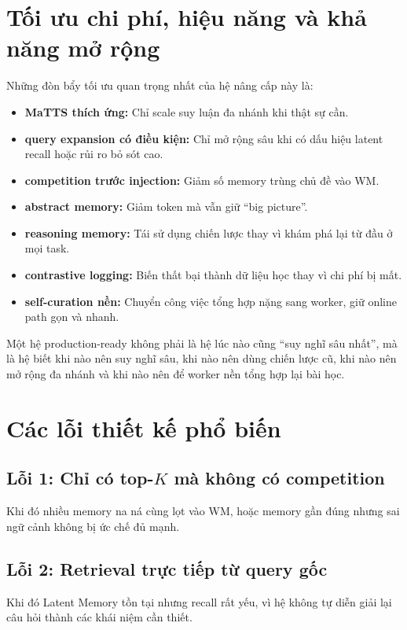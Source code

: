 \documentclass[a4paper,12pt]{article}
\begin{document}
\section{Tối ưu chi phí, hiệu năng và khả năng mở rộng}

Những đòn bẩy tối ưu quan trọng nhất của hệ nâng cấp này là:
\begin{itemize}
    \item \textbf{MaTTS thích ứng:} Chỉ scale suy luận đa nhánh khi thật sự cần.
    \item \textbf{query expansion có điều kiện:} Chỉ mở rộng sâu khi có dấu hiệu latent recall hoặc rủi ro bỏ sót cao.
    \item \textbf{competition trước injection:} Giảm số memory trùng chủ đề vào WM.
    \item \textbf{abstract memory:} Giảm token mà vẫn giữ ``big picture''.
    \item \textbf{reasoning memory:} Tái sử dụng chiến lược thay vì khám phá lại từ đầu ở mọi task.
    \item \textbf{contrastive logging:} Biến thất bại thành dữ liệu học thay vì chi phí bị mất.
    \item \textbf{self-curation nền:} Chuyển công việc tổng hợp nặng sang worker, giữ online path gọn và nhanh.
\end{itemize}

Một hệ production-ready không phải là hệ lúc nào cũng ``suy nghĩ sâu nhất'', mà là hệ biết khi nào nên suy nghĩ sâu, khi nào nên dùng chiến lược cũ, khi nào nên mở rộng đa nhánh và khi nào nên để worker nền tổng hợp lại bài học.

\section{Các lỗi thiết kế phổ biến}

\subsection*{Lỗi 1: Chỉ có top-$K$ mà không có competition}

Khi đó nhiều memory na ná cùng lọt vào WM, hoặc memory gần đúng nhưng sai ngữ cảnh không bị ức chế đủ mạnh.

\subsection*{Lỗi 2: Retrieval trực tiếp từ query gốc}

Khi đó Latent Memory tồn tại nhưng recall rất yếu, vì hệ không tự diễn giải lại câu hỏi thành các khái niệm cần thiết.
\end{document}
